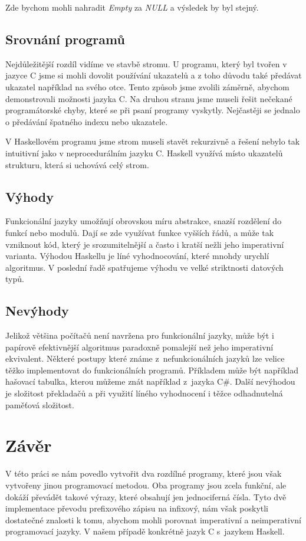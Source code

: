 \documentclass[12pt,a4paper]{report}
\begin{document}
Zde bychom mohli nahradit \textit{Empty} za \textit{NULL} a výsledek by byl stejný.    
\section{Srovnání programů}
Nejdůležitější rozdíl vidíme ve stavbě stromu. U programu, který byl tvořen v jazyce C jsme si mohli dovolit používání ukazatelů a z toho důvodu také předávat ukazatel například na svého otce. Tento způsob jsme zvolili záměrně, abychom demonstrovali možnosti jazyka C. Na druhou stranu jsme museli řešit nečekané programátorské chyby, které se při psaní programy vyskytly. Nejčastěji se jednalo o předávání špatného indexu nebo ukazatele. 

V Haskellovém programu jsme strom museli stavět rekurzivně a řešení nebylo tak intuitivní jako v neprocedurálním jazyku C. Haskell využívá místo ukazatelů strukturu, která si uchovává celý strom.  

\section{Výhody}
Funkcionální jazyky umožňují obrovskou míru abstrakce, snazší rozdělení do funkcí nebo modulů. Dají se zde využívat funkce vyšších řádů, a může tak vzniknout kód, který je srozumitelnější a často i kratší nežli jeho imperativní varianta. Výhodou Haskellu je líné vyhodnocování, které mnohdy urychlí algoritmus. V poslední řadě spatřujeme výhodu ve velké striktnosti datových typů.
\section{Nevýhody}
Jelikož většina počítačů není navržena pro funkcionální jazyky, může být i papírově efektivnější algoritmus paradoxně pomalejší než jeho imperativní ekvivalent. Některé postupy které známe z~nefunkcionálních jazyků lze velice těžko implementovat do funkcionálních programů. Příkladem může být například hašovací tabulka, kterou můžeme znát například z~jazyka C\#. 
Další nevýhodou je složitost překladačů a při využití líného vyhodnocení i těžce odhadnutelná paměťová složitost.

\chapter{Závěr}
V této práci se nám povedlo vytvořit dva rozdílné programy, které jsou však vytvořeny jinou programovací metodou. Oba programy jsou zcela funkční, ale dokáží převádět takové výrazy, které obsahují jen jednociferná čísla. Tyto dvě implementace převodu prefixového zápisu na infixový, nám však poskytli dostatečné znalosti k tomu, abychom mohli porovnat imperativní a neimperativní programovací jazyky. V našem případě konkrétně jazyk C s~jazykem Haskell. 
\end{document}
